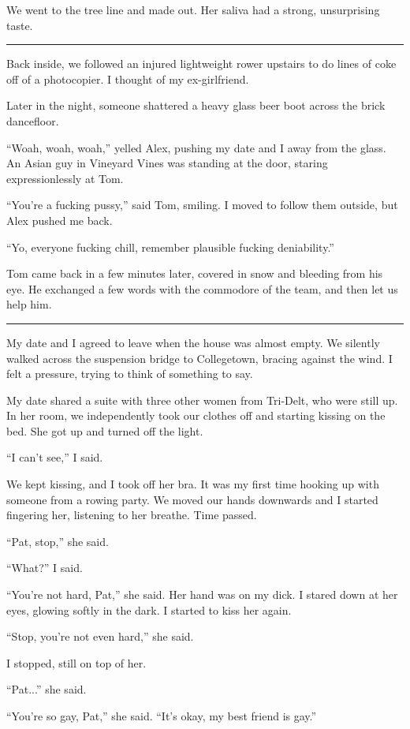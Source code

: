 We went to the tree line and made out.  Her saliva had a strong, unsurprising
taste.

\plainfancybreak{12pt}{2}{}

Back inside, we followed an injured lightweight rower upstairs to do lines of
coke off of a photocopier.  I thought of my ex-girlfriend.

Later in the night, someone shattered a heavy glass beer boot across the brick
dancefloor.

``Woah, woah, woah,'' yelled Alex, pushing my date and I away from the glass.
An Asian guy in Vineyard Vines was standing at the door, staring
expressionlessly at Tom.

``You're a fucking pussy,'' said Tom, smiling.  I moved to follow them outside,
but Alex pushed me back.

``Yo, everyone fucking chill, remember plausible fucking deniability.''

Tom came back in a few minutes later, covered in snow and bleeding from his eye.
He exchanged a few words with the commodore of the team, and then let us help
him.

\plainfancybreak{12pt}{2}{}

My date and I agreed to leave when the house was almost empty.  We silently
walked across the suspension bridge to Collegetown, bracing against the wind.  I
felt a pressure, trying to think of something to say.

My date shared a suite with three other women from Tri-Delt, who were still up.
In her room, we independently took our clothes off and starting kissing on the
bed.  She got up and turned off the light.

``I can't see,'' I said.

We kept kissing, and I took off her bra.  It was my first time hooking up with
someone from a rowing party.  We moved our hands downwards and I started
fingering her, listening to her breathe.  Time passed.

``Pat, stop,'' she said.

``What?'' I said.

``You're not hard, Pat,'' she said.  Her hand was on my dick.  I stared down at
her eyes, glowing softly in the dark.  I started to kiss her again.

``Stop, you're not even hard,'' she said.

I stopped, still on top of her.

``Pat...'' she said.

``You're so gay, Pat,'' she said.  ``It's okay, my best friend is gay.''

